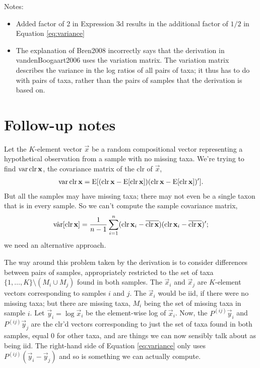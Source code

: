 Notes:
\begin{itemize}
  \item Added factor of 2 in Expression 3d results in the additional factor of
    $1/2$ in Equation \eqref{eq:variance}
  \item The explanation of Bren2008 incorrectly says that the derivation in
    vandenBoogaart2006 uses the variation matrix. The variation matrix
    describes the variance in the log ratios of all pairs of taxa; it thus has
    to do with pairs of taxa, rather than the pairs of samples that the
    derivation is based on.
\end{itemize}

\section{Follow-up notes}

Let the $K$-element vector $\vec x$ be a random compositional vector
representing a hypothetical observation from a sample with no missing taxa.
We're trying to find $\operatorname{var} \operatorname{clr} \mathbf{x}$, the covariance matrix of the clr of
$\vec x$,
\begin{align*}
  \operatorname{var} \operatorname{clr} \mathbf{x} 
  = \operatorname{E}[ (\operatorname{clr} \mathbf{x} - \operatorname{E}[\operatorname{clr} \mathbf{x}]) (\operatorname{clr} \mathbf{x} - \operatorname{E}[\operatorname{clr}
    \mathbf{x}])'].
\end{align*}
But all the samples may have missing taxa; there may not even be a single taxon
that is in every sample. So we can't compute the sample covariance matrix,
\begin{align*}
  \hat{\operatorname{var}}[\operatorname{clr} \mathbf{x}] =
  \frac{1}{n-1} \sum_{i=1}^n 
    (\operatorname{clr} \mathbf{x}_i - \overline{\operatorname{clr} \mathbf{x}}) 
    (\operatorname{clr} \mathbf{x}_i - \overline{\operatorname{clr} \mathbf{x}})';
\end{align*}
we need an alternative approach. 

The way around this problem taken by the derivation is to consider differences
between pairs of samples, appropriately restricted to the set of taxa
$\{1,\dots, K\} \setminus (M_i\cup M_j)$ found in both samples.  The $\vec x_i$
and $\vec x_j$ are $K$-element vectors corresponding to samples $i$ and $j$.
The $\vec x_i$ would be iid, if there were no missing taxa; but there are
missing taxa, $M_i$ being the set of missing taxa in sample $i$. Let $\vec y_i
= \log \vec x_i$ be the element-wise log of $\vec x_i$. Now, the $P^{(ij)} \vec
y_i$ and $P^{(ij)} \vec y_j$ are the clr'd vectors corresponding to just the
set of taxa found in both samples, equal 0 for other taxa, and are things we
can now sensibly talk about as being iid. The right-hand side of Equation
\eqref{eq:variance} only uses $P^{(ij)} (\vec y_i - \vec y_j)$ and so is
something we can actually compute.

